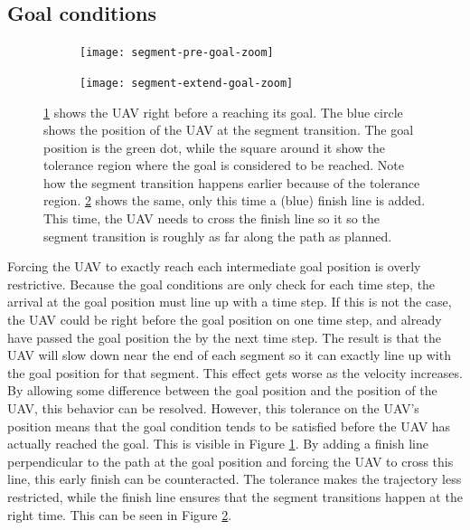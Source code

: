 \subsection{Goal conditions}
\label{subsec:goal-cond}

\begin{figure}
	\centering
	\begin{subfigure}[t]{0.45\columnwidth}
        		\texttt{[image: segment-pre-goal-zoom]}
        		\caption{}
        		 \label{fig:goal-ext-pre}
	\end{subfigure}	
		\hfil
	\begin{subfigure}[t]{0.45\columnwidth}
        		\texttt{[image: segment-extend-goal-zoom]}
        		\caption{}
        		\label{fig:goal-ext-post}
	\end{subfigure}
    \caption[A visualization of the extended goal conditions]{\ref{fig:goal-ext-pre} shows the UAV right before a reaching its goal. The blue circle shows the position of the UAV at the segment transition. The goal position is the green dot, while the square around it show the tolerance region where the goal is considered to be reached. Note how the segment transition happens earlier because of the tolerance region. \ref{fig:goal-ext-post} shows the same, only this time a (blue) finish line is added. This time, the UAV needs to cross the finish line so it so the segment transition is roughly as far along the path as planned.}
    \label{fig:goal-ext}     
\end{figure}
Forcing the UAV to exactly reach each intermediate goal position is overly restrictive. Because the goal conditions are only check for each time step, the arrival at the goal position must line up with a time step. If this is not the case, the UAV could be right before the goal position on one time step, and already have passed the goal position the by the next time step. The result is that the UAV will slow down near the end of each segment so it can exactly line up with the goal position for that segment. This effect gets worse as the velocity increases.
\\
By allowing some difference between the goal position and the position of the UAV, this behavior can be resolved. However, this tolerance on the UAV's position means that the goal condition tends to be satisfied before the UAV has actually reached the goal. This is visible in Figure \ref{fig:goal-ext-pre}. By adding a finish line perpendicular to the path at the goal position and forcing the UAV to cross this line, this early finish can be counteracted. The tolerance makes the trajectory less restricted, while the finish line ensures that the segment transitions happen at the right time. This can be seen in Figure \ref{fig:goal-ext-post}.

